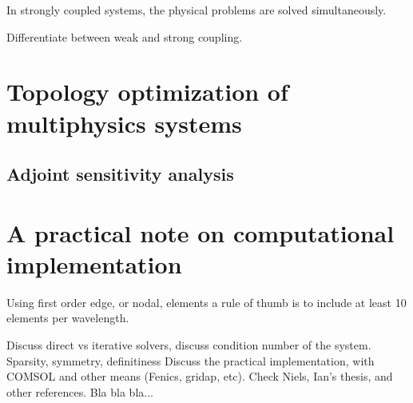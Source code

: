 In strongly coupled systems, the physical problems are solved simultaneously.

Differentiate between weak and strong coupling.

\section{Topology optimization of multiphysics systems}

\subsection{Adjoint sensitivity analysis}

\section{A practical note on computational implementation}

Using first order edge, or nodal, elements a rule of thumb is to include at least 10 elements per wavelength.

Discuss direct vs iterative solvers, discuss condition number of the system.
Sparsity, symmetry, definitiness
Discuss the practical implementation, with COMSOL and other means (Fenics, gridap, etc).
Check Niels, Ian's thesis, and other references.
Bla bla bla...